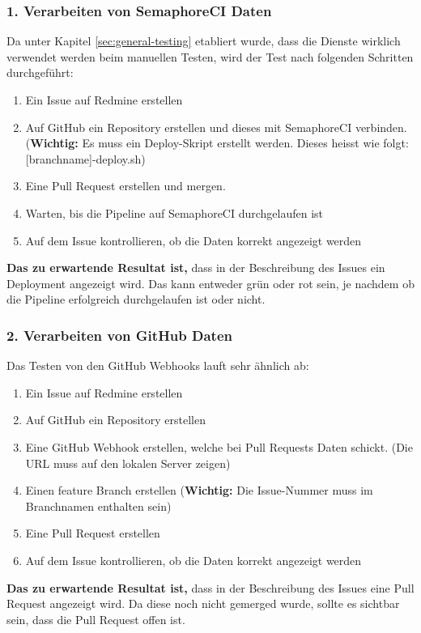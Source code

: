 \subsubsection{1. Verarbeiten von SemaphoreCI Daten}
Da unter Kapitel \ref{sec:general-testing} etabliert wurde, dass die Dienste wirklich verwendet werden beim manuellen Testen,
wird der Test nach folgenden Schritten durchgeführt:
\begin{enumerate}
  \item Ein Issue auf Redmine erstellen
  \item Auf GitHub ein Repository erstellen und dieses mit SemaphoreCI verbinden. 
  (\textbf{Wichtig:} Es muss ein Deploy-Skript erstellt werden. Dieses heisst wie folgt:
  [branchname]-deploy.sh)
  \item Eine Pull Request erstellen und mergen.
  \item Warten, bis die Pipeline auf SemaphoreCI durchgelaufen ist
  \item Auf dem Issue kontrollieren, ob die Daten korrekt angezeigt werden
\end{enumerate}

\textbf{Das zu erwartende Resultat ist,} dass in der Beschreibung des Issues ein Deployment angezeigt wird. Das kann entweder grün oder rot
sein, je nachdem ob die Pipeline erfolgreich durchgelaufen ist oder nicht.

\subsubsection{2. Verarbeiten von GitHub Daten}
\label{sec:github-testing}
Das Testen von den GitHub Webhooks lauft sehr ähnlich ab:
\begin{enumerate}
  \item Ein Issue auf Redmine erstellen
  \item Auf GitHub ein Repository erstellen
  \item Eine GitHub Webhook erstellen, welche bei Pull Requests Daten schickt. (Die URL muss auf den lokalen Server zeigen)
  \item Einen feature Branch erstellen (\textbf{Wichtig:} Die Issue-Nummer muss im Branchnamen enthalten sein)
  \item Eine Pull Request erstellen
  \item Auf dem Issue kontrollieren, ob die Daten korrekt angezeigt werden
\end{enumerate}

\textbf{Das zu erwartende Resultat ist,} dass in der Beschreibung des Issues eine Pull Request angezeigt wird. Da diese noch nicht gemerged
wurde, sollte es sichtbar sein, dass die Pull Request offen ist.

